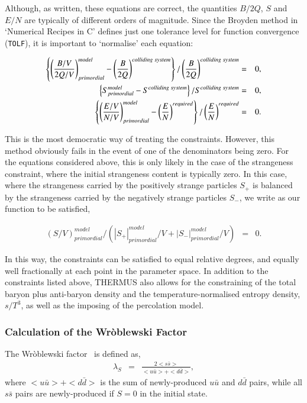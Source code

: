 \documentclass{elsarticle}
\begin{document}
Although, as written, these equations are correct, the quantities $B/2Q$, $S$ and 
$E/N$ are typically of different orders of magnitude. Since the Broyden method in `Numerical 
Recipes in C' defines just one tolerance level for function convergence (\texttt{TOLF}), it 
is important to `normalise' each equation:

\begin{eqnarray*}
\left\{\left({B/V \over 2Q/V}\right)_{primordial}^{model} - \left({B \over 2Q}\right)^{colliding\;system}\right\} / \left({B \over 2Q}\right)^{colliding\;system}  &=& 0,\\
\left\{S_{primordial}^{model} - S^{colliding\;system}\right\} / S^{colliding\;system} &=& 0,\\
\left\{\left({E/V \over N/V}\right)_{primordial}^{model} - \left({E \over N}\right)^{required}\right\} / \left({E \over N}\right)^{required}&=& 0.
\end{eqnarray*}

This is the most democratic way of treating the constraints. However, this method obviously fails 
in the event of one of the denominators being zero. For the equations considered above, this is only 
likely in the case of the strangeness constraint, where the initial strangeness content is typically zero. In 
this 
case, where the strangeness carried by the positively strange particles $S_+$ is balanced by the 
strangeness carried by the negatively strange particles $S_-$, we write as our function to be 
satisfied,

\begin{eqnarray*}
\left(S/V\right)_{primordial}^{model}/ \left(|S_+|_{primordial}^{model}/V+|S_-|_{primordial}^{model}/V\right) &=& 0.
\end{eqnarray*}

In this way, the constraints can be satisfied to equal relative degrees, and equally well fractionally 
at each point in the parameter space. In addition to the constraints listed above, THERMUS also allows for 
the constraining of the total baryon plus anti-baryon density and the temperature-normalised entropy 
density, $s/T^3$, as well as the imposing of the percolation model.\\

\subsubsection{Calculation of the Wr\`oblewski Factor}\label{Wrob}

The Wr\`oblewski factor~\cite{Wroblewski:1985sz} is defined as,
\begin{eqnarray*}
\lambda_S &=& \frac{2<s\bar{s}>}{<u\bar{u}>+<d\bar{d}>},
\end{eqnarray*}
where $<u\bar{u}>+<d\bar{d}>$ is the sum of newly-produced $u\bar{u}$
and $d\bar{d}$ pairs, while all $s\bar{s}$ pairs are newly-produced if $S=0$ in the initial state.\\ 
\end{document}
